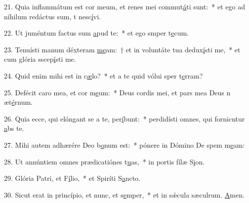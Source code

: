 21. Quia inflammátum est cor meum, et renes mei commut\uline{á}ti sunt:~* et ego ad níhilum redáctus sum, t nesc\uline{í}vi.\par 
22. Ut juméntum factus sum \uline{a}pud te:~* et ego smper t\uline{e}cum.\par 
23. Tenuísti manum déxteram \uline{me}am:~† et in voluntáte tua dedux\uline{í}sti me,~* et cum glória sscep\uline{í}sti me.\par 
24. Quid enim mihi est in c\uline{æ}lo?~* et a te quid vólui sper t\uline{e}rram?\par 
25. Defécit caro mea, et cor m\uline{e}um:~* Deus cordis mei, et pars mea Deus n æt\uline{é}rnum.\par 
26. Quia ecce, qui elóngant se a te, per\uline{í}bunt:~* perdidísti omnes, qui fornicntur \uline{a}bs te.\par 
27. Mihi autem adhærére Deo b\uline{o}num est:~* pónere in Dómino De spem m\uline{e}am:\par 
28. Ut annúntiem omnes prædicatiónes t\uline{u}as,~* in portis fílæ S\uline{i}on.\par 
29. Glória Patri, et F\uline{í}lio,~* et Spiríti S\uline{a}ncto.\par 
30. Sicut erat in princípio, et nunc, et s\uline{e}mper,~* et in sǽcula sæculrum. \uline{A}men.\par 
